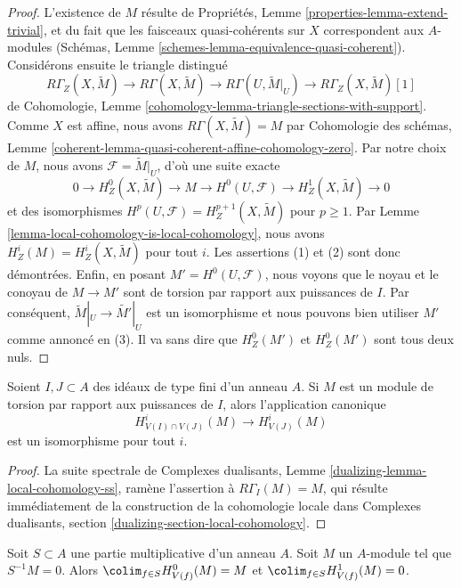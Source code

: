 \begin{proof}
L'existence de $M$ résulte de
Propriétés, Lemme \ref{properties-lemma-extend-trivial},
et du fait que les faisceaux quasi-cohérents sur $X$ correspondent
aux $A$-modules (Schémas, Lemme \ref{schemes-lemma-equivalence-quasi-coherent}).
Considérons ensuite le triangle distingué
$$
R\Gamma_Z(X, \widetilde{M}) \to R\Gamma(X, \widetilde{M}) \to
R\Gamma(U, \widetilde{M}|_U) \to R\Gamma_Z(X, \widetilde{M})[1]
$$
de Cohomologie, Lemme \ref{cohomology-lemma-triangle-sections-with-support}.
Comme $X$ est affine, nous avons $R\Gamma(X, \widetilde{M}) = M$
par Cohomologie des schémas, Lemme
\ref{coherent-lemma-quasi-coherent-affine-cohomology-zero}.
Par notre choix de $M$, nous avons $\mathcal{F} = \widetilde{M}|_U$,
d'où une suite exacte
$$
0 \to H^0_Z(X, \widetilde{M}) \to M \to H^0(U, \mathcal{F}) \to
H^1_Z(X, \widetilde{M}) \to 0
$$
et des isomorphismes $H^p(U, \mathcal{F}) = H^{p + 1}_Z(X, \widetilde{M})$
pour $p \geq 1$. Par Lemme \ref{lemma-local-cohomology-is-local-cohomology},
nous avons $H^i_Z(M) = H^i_Z(X, \widetilde{M})$ pour tout $i$.
Les assertions (1) et (2) sont donc démontrées.
Enfin, en posant $M' = H^0(U, \mathcal{F})$, nous voyons que
le noyau et le conoyau de $M \to M'$ sont de torsion par rapport aux puissances de $I$.
Par conséquent, $\widetilde{M}|_U \to \widetilde{M'}|_U$ est un isomorphisme
et nous pouvons bien utiliser $M'$ comme annoncé en (3). Il va sans dire
que $H^0_Z(M')$ et $H^0_Z(M')$ sont tous deux nuls.
\end{proof}

\begin{lemma}
\label{lemma-already-torsion}
Soient $I, J \subset A$ des idéaux de type fini d'un anneau $A$.
Si $M$ est un module de torsion par rapport aux puissances de $I$, alors l'application
canonique
$$
H^i_{V(I) \cap V(J)}(M) \to H^i_{V(J)}(M)
$$
est un isomorphisme pour tout $i$.
\end{lemma}

\begin{proof}
La suite spectrale de
Complexes dualisants, Lemme \ref{dualizing-lemma-local-cohomology-ss},
ramène l'assertion à $R\Gamma_I(M) = M$, qui résulte immédiatement
de la construction de la cohomologie locale dans
Complexes dualisants, section \ref{dualizing-section-local-cohomology}.
\end{proof}

\begin{lemma}
\label{lemma-multiplicative}
Soit $S \subset A$ une partie multiplicative d'un anneau $A$.
Soit $M$ un $A$-module tel que $S^{-1}M = 0$. Alors
$\colim_{f \in S} H^0_{V(f)}(M) = M$ et
$\colim_{f \in S} H^1_{V(f)}(M) = 0$.
\end{lemma}

